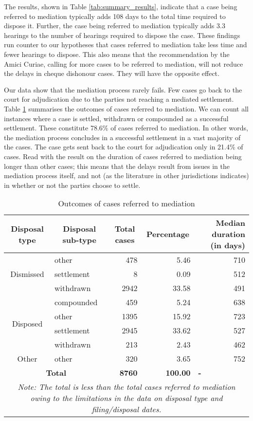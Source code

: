 The results, shown in Table \ref{tab:summary_results}, indicate that a case being referred to mediation typically adds 108 days to the total time required to dispose it. Further, the case being referred to mediation typically adds 3.3 hearings to the number of hearings required to dispose the case. These findings run counter to our hypotheses that cases referred to mediation take less time and fewer hearings to dispose. This also means that the recommendation by the Amici Curiae, calling for more cases to be referred to mediation, will not reduce the delays in cheque dishonour cases. They will have the opposite effect.

Our data show that the mediation process rarely fails. Few cases go back to the court for adjudication due to the parties not reaching a mediated settlement. Table \ref{tab:mediation} summarises the outcomes of cases referred to mediation. We can count all instances where a case is settled, withdrawn or compounded as a successful settlement. These constitute 78.6\% of cases referred to mediation. In other words, the mediation process concludes in a successful settlement in a vast majority of the cases. The case gets sent back to the court for adjudication only in 21.4\% of cases. Read with the result on the duration of cases referred to mediation being longer than other cases; this means that the delays result from issues in the mediation process itself, and not (as the literature in other jurisdictions indicates) in whether or not the parties choose to settle.

{\footnotesize \begin{longtable}{@{}clrrr@{}}
 \caption{Outcomes of cases referred to mediation}
 \label{tab:mediation}\\
 \toprule
 \textbf{Disposal type} & \multicolumn{1}{c}{\textbf{Disposal sub-type}} & \multicolumn{1}{c}{\textbf{Total cases}} & \multicolumn{1}{c}{\textbf{Percentage}} & \multicolumn{1}{p{3cm}}{\textbf{Median duration (in days)}} \\
 \midrule \endhead
 \multirow{3}{*}{Dismissed} & other & 478 & 5.46 & 710 \\
 & settlement & 8 & 0.09 & 512 \\
 & withdrawn & 2942 & 33.58 & 491 \\
 \midrule
 \multirow{4}{*}{Disposed} & compounded & 459 & 5.24 & 638 \\
 & other & 1395 & 15.92 & 723 \\
 & settlement & 2945 & 33.62 & 527 \\
 & withdrawn & 213 & 2.43 & 462 \\
 \midrule
 Other & other & 320 & 3.65 & 752 \\
 \midrule
 \multicolumn{2}{c}{\textbf{Total}} & \textbf{8760} & \textbf{100.00} & \multicolumn{1}{l}{\textbf{-}} \\
 \bottomrule \multicolumn{5}{p{11cm}}{{\footnotesize \emph{Note:
 The total is less than the total cases referred to mediation owing to the limitations in the data on disposal type and filing/disposal dates.}}}
 \end{longtable}}

